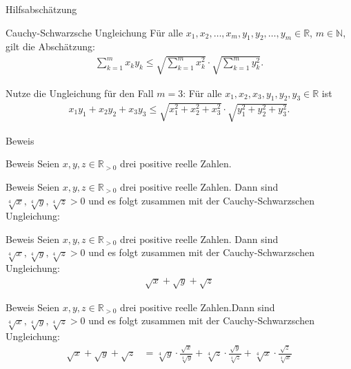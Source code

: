 \documentclass[10pt]{beamer}
\def\bN{\mathbb{N}}
\def\bR{\mathbb{R}}
\begin{document}
\begin{frame}{Hilfsabschätzung}
    \begin{block}{Cauchy-Schwarzsche Ungleichung}
        Für alle \( x_{1}, x_{2}, \ldots, x_{m}, y_{1}, y_{2}, \ldots, y_{m} \in \bR \), \( m \in \bN \), gilt die Abschätzung:
        \begin{align*}
            \sum_{k = 1}^{m} x_{k} y_{k}
            \leq \sqrt{\sum_{k = 1}^{m} x_{k}^{2}} \cdot \sqrt{\sum_{k = 1}^{m} y_{k}^{2}}.
        \end{align*}
    \end{block}
    Nutze die Ungleichung für den Fall \( m = 3 \): Für alle \( x_{1}, x_{2}, x_{3}, y_{1}, y_{2}, y_{3} \in \bR \) ist
    \begin{align*}
        x_{1}y_{1} + x_{2}y_{2} + x_{3}y_{3}
        \leq \sqrt{x_{1}^{2} + x_{2}^{2} + x_{3}^{2}} \cdot \sqrt{y_{1}^{2} + y_{2}^{2} + y_{3}^{2}}.
    \end{align*}
\end{frame}



\begin{frame}{Beweis}
    
\end{frame}



\begin{frame}{Beweis}
    Seien \( x, y, z \in \bR_{> 0} \) drei positive reelle Zahlen.
\end{frame}



\begin{frame}{Beweis}
    Seien \( x, y, z \in \bR_{> 0} \) drei positive reelle Zahlen. Dann sind \( \sqrt[4]{x}, \sqrt[4]{y}, \sqrt[4]{z} > 0 \) und es folgt zusammen mit der Cauchy-Schwarzschen Ungleichung:
\end{frame}



\begin{frame}{Beweis}
    Seien \( x, y, z \in \bR_{> 0} \) drei positive reelle Zahlen. Dann sind \( \sqrt[4]{x}, \sqrt[4]{y}, \sqrt[4]{z} > 0 \) und es folgt zusammen mit der Cauchy-Schwarzschen Ungleichung:
    \begin{align*}
        \sqrt{x} + \sqrt{y} + \sqrt{z}
    \end{align*}
\end{frame}



\begin{frame}{Beweis}
    Seien \( x, y, z \in \bR_{> 0} \) drei positive reelle Zahlen.Dann sind \( \sqrt[4]{x}, \sqrt[4]{y}, \sqrt[4]{z} > 0 \) und es folgt zusammen mit der Cauchy-Schwarzschen Ungleichung:
    \begin{align*}
        \sqrt{x} + \sqrt{y} + \sqrt{z}
        & = \sqrt[4]{y} \cdot \frac{\sqrt{x}}{\sqrt[4]{y}} + \sqrt[4]{z} \cdot \frac{\sqrt{y}}{\sqrt[4]{z}} + \sqrt[4]{x} \cdot \frac{\sqrt{z}}{\sqrt[4]{x}}
    \end{align*}
\end{frame}
\end{document}
